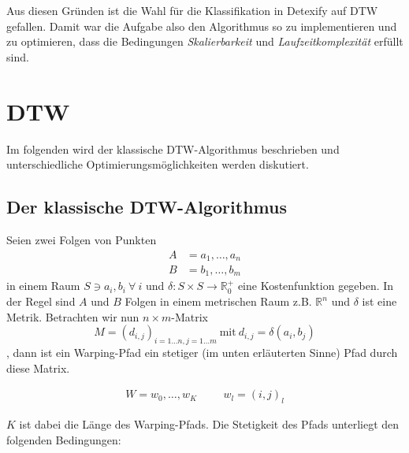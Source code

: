 Aus diesen Gründen ist die Wahl für die Klassifikation in Detexify auf DTW gefallen. Damit war die Aufgabe also den Algorithmus so zu implementieren und zu optimieren, dass die Bedingungen \emph{Skalierbarkeit} und \emph{Laufzeitkomplexität} erfüllt sind.

\section{DTW} %
\label{sec:dtw}

Im folgenden wird der klassische DTW-Algorithmus beschrieben und unterschiedliche Optimierungsmöglichkeiten werden diskutiert.

\subsection{Der klassische DTW-Algorithmus} %
\label{sub:der_klassische_dtw_algorithmus}

Seien zwei Folgen von Punkten
\begin{align}
  \label{eqn:a}
  A &= a_1, \dots, a_n \\
  \label{eqn:b}
  B &= b_1, \dots, b_m
\end{align}
in einem Raum \( S \ni a_i, b_i ~\forall~i \) und %
\( \delta : S\times S \rightarrow \mathbb{R}_0^+ \) eine Kostenfunktion
gegeben. In der Regel sind \(A\) und \(B\) Folgen in einem metrischen Raum z.B. \(\mathbb{R}^n\) und \(\delta\) ist eine Metrik.
Betrachten wir nun \( n\times m\)-Matrix 
\begin{equation} \label{eqn:matrix}
  M = (d_{i,j})_{i=1\dots n, j=1\dots m} ~\text{mit}~ d_{i,j} = \delta(a_i,b_j)
\end{equation}
, dann ist ein Warping-Pfad ein stetiger (im unten erläuterten Sinne) Pfad durch diese Matrix. 

\begin{align}
  W = w_0,\dots,w_K \hspace{1cm} w_l = (i,j)_l
\end{align}

$K$ ist dabei die Länge des Warping-Pfads. Die Stetigkeit des Pfads unterliegt den folgenden Bedingungen:

